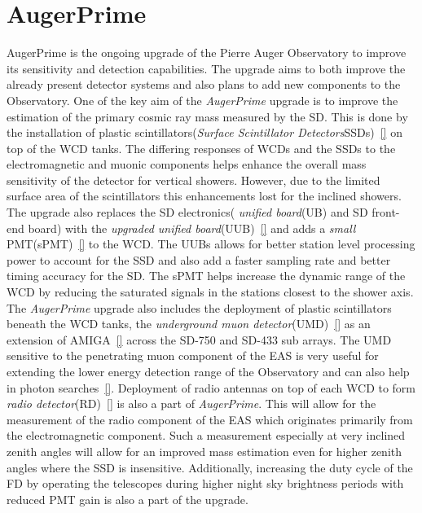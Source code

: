 \section{AugerPrime}
\label{sec:Aug_prime}
AugerPrime is the ongoing upgrade of the Pierre Auger Observatory to improve its sensitivity and detection capabilities. The upgrade aims to both improve the already present detector systems and also plans to add new components to the Observatory. One of the key aim of the \textit{AugerPrime} upgrade is to improve the estimation of the primary cosmic ray mass measured by the SD. This is done by the installation of plastic scintillators(\textit{Surface Scintillator Detectors}SSDs)~\ref{} on top of the WCD tanks. The differing responses of WCDs and the SSDs to the electromagnetic and muonic components helps enhance the overall mass sensitivity of the detector for vertical showers. However, due to the limited surface area of the scintillators this enhancements lost for the inclined showers. The upgrade also replaces the SD electronics( \textit{unified board}(UB) and SD front-end board) with the \textit{upgraded unified board}(UUB)~\ref{} and adds a \textit{small} PMT(sPMT)~\ref{} to the WCD. The UUBs allows for better station level processing power to account for the SSD and also add a faster sampling rate and better timing accuracy for the SD. The sPMT helps increase the dynamic range of the WCD by reducing the saturated signals in the stations closest to the shower axis. The \textit{AugerPrime} upgrade also includes the deployment of plastic scintillators beneath the WCD tanks, the \textit{underground muon detector}(UMD)~\ref{} as an extension of AMIGA~\ref{} across the SD-750 and SD-433 sub arrays. The UMD sensitive to the penetrating muon component of the EAS is very useful for extending the lower energy detection range of the Observatory and can also help in photon searches~\ref{}. Deployment of radio antennas on top of each WCD to form \textit{radio detector}(RD)~\ref{} is also a part of \textit{AugerPrime}. This will allow for the measurement of the radio component of the EAS which originates primarily from the electromagnetic component. Such a measurement especially at very inclined zenith angles will allow for an improved mass estimation even for higher zenith angles where the SSD is insensitive. Additionally, increasing the duty cycle of the FD by operating the telescopes during higher night sky brightness periods with reduced PMT gain is also a part of the upgrade. 

